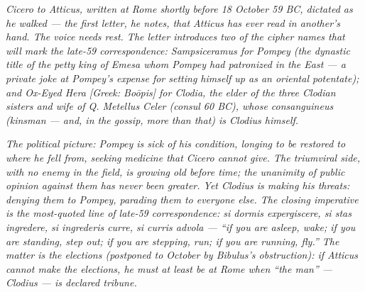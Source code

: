 
\textit{Cicero to Atticus, written at Rome shortly before 18
October 59 BC, dictated as he walked --- the first letter, he
notes, that Atticus has ever read in another's hand. The voice
needs rest. The letter introduces two of the cipher names that
will mark the late-59 correspondence: \textit{Sampsiceramus}
for Pompey (the dynastic title of the petty king of Emesa whom
Pompey had patronized in the East --- a private joke at
Pompey's expense for setting himself up as an oriental
potentate); and \textit{Ox-Eyed Hera} \textit{[Greek:
Bo\=opis]} for Clodia, the elder of the three Clodian sisters
and wife of Q. Metellus Celer (consul 60 BC), whose
\textit{consanguineus} (kinsman --- and, in the gossip, more
than that) is Clodius himself.}

\textit{The political picture: Pompey is sick of his condition,
longing to be restored to where he fell from, seeking medicine
that Cicero cannot give. The triumviral side, with no enemy in
the field, is growing old before time; the unanimity of public
opinion against them has never been greater. Yet Clodius is
making his threats: denying them to Pompey, parading them to
everyone else. The closing imperative is the most-quoted line
of late-59 correspondence: \textit{si dormis expergiscere, si
stas ingredere, si ingrederis curre, si curris advola} ---
``if you are asleep, wake; if you are standing, step out; if
you are stepping, run; if you are running, fly.'' The matter
is the elections (postponed to October by Bibulus's
obstruction): if Atticus cannot make the elections, he must
at least be at Rome when ``the man'' --- Clodius --- is
declared tribune.}
